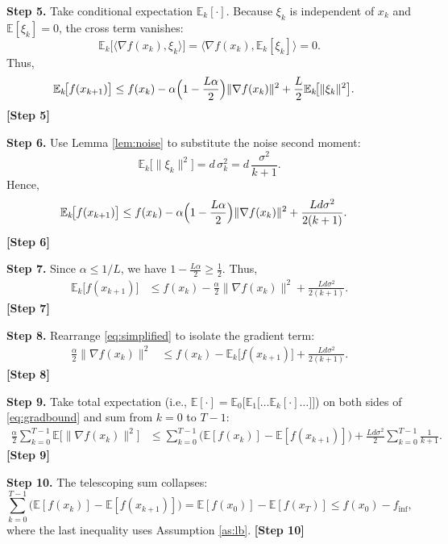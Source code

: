 \documentclass{article}
\newcommand{\E}{\mathbb{E}}
\begin{document}
\noindent\textbf{Step 5.} Take conditional expectation $\E_{k}[\cdot]$.
Because $\xi_{k}$ is independent of $x_{k}$ and $\E[\xi_{k}]=0$, the cross term vanishes:
\[
\E_{k}\bigl[\langle\nabla f(x_{k}),\xi_{k}\rangle\bigr]=
\langle\nabla f(x_{k}),\E_{k}[\xi_{k}]\rangle=0.
\]
Thus,
\begin{align}
\E_{k}\!\bigl[f(x_{k+1})\bigr]
&\le f(x_{k})
-\alpha\Bigl(1-\frac{L\alpha}{2}\Bigr)\|\nabla f(x_{k})\|^{2}
+\frac{L}{2}\E_{k}\!\bigl[\|\xi_{k}\|^{2}\bigr]. \label{eq:condexp}
\end{align}
\textbf{[Step 5]}

\noindent\textbf{Step 6.} Use Lemma \ref{lem:noise} to substitute the noise second moment:
\[
\E_{k}\!\bigl[\|\xi_{k}\|^{2}\bigr]=d\,\sigma_{k}^{2}=d\,\frac{\sigma^{2}}{k+1}.
\]
Hence,
\begin{align}
\E_{k}\!\bigl[f(x_{k+1})\bigr]
&\le f(x_{k})
-\alpha\Bigl(1-\frac{L\alpha}{2}\Bigr)\|\nabla f(x_{k})\|^{2}
+\frac{Ld\sigma^{2}}{2(k+1)}. \label{eq:afternoise}
\end{align}
\textbf{[Step 6]}

\noindent\textbf{Step 7.} Since $\alpha\le 1/L$, we have $1-\frac{L\alpha}{2}\ge \frac{1}{2}$.
Thus,
\begin{align}
\E_{k}\!\bigl[f(x_{k+1})\bigr]
&\le f(x_{k})
-\frac{\alpha}{2}\|\nabla f(x_{k})\|^{2}
+\frac{Ld\sigma^{2}}{2(k+1)}. \label{eq:simplified}
\end{align}
\textbf{[Step 7]}

\noindent\textbf{Step 8.} Rearrange \eqref{eq:simplified} to isolate the gradient term:
\begin{align}
\frac{\alpha}{2}\|\nabla f(x_{k})\|^{2}
&\le f(x_{k})-\E_{k}\!\bigl[f(x_{k+1})\bigr]
+\frac{Ld\sigma^{2}}{2(k+1)}. \label{eq:gradbound}
\end{align}
\textbf{[Step 8]}

\noindent\textbf{Step 9.} Take total expectation (i.e., $\E[\cdot]=\E_{0}\!\bigl[\E_{1}\!\bigl[\dots\E_{k}[\cdot]\dots]\bigr]$) on both sides of \eqref{eq:gradbound} and sum from $k=0$ to $T-1$:
\begin{align}
\frac{\alpha}{2}\sum_{k=0}^{T-1}\E\!\bigl[\|\nabla f(x_{k})\|^{2}\bigr]
&\le \sum_{k=0}^{T-1}\bigl(\E[f(x_{k})]-\E[f(x_{k+1})]\bigr)
+\frac{Ld\sigma^{2}}{2}\sum_{k=0}^{T-1}\frac{1}{k+1}. \label{eq:sum}
\end{align}
\textbf{[Step 9]}

\noindent\textbf{Step 10.} The telescoping sum collapses:
\[
\sum_{k=0}^{T-1}\bigl(\E[f(x_{k})]-\E[f(x_{k+1})]\bigr)
= \E[f(x_{0})]-\E[f(x_{T})]
\le f(x_{0})-f_{\inf},
\]
where the last inequality uses Assumption \ref{as:lb}.
\textbf{[Step 10]}
\end{document}
